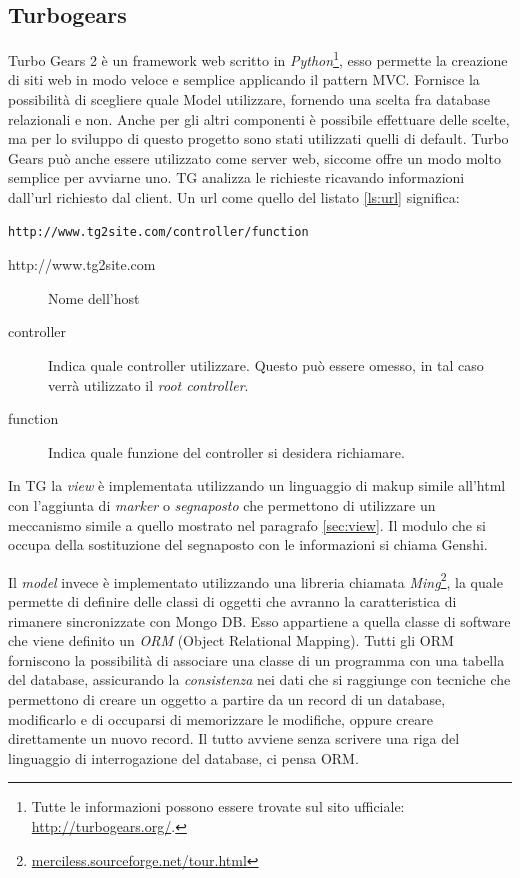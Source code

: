 \subsection{Turbogears}\label{sec:tg}
Turbo Gears 2 è un framework web scritto in \emph{Python}\footnote{Tutte le informazioni possono essere trovate sul sito ufficiale: \url{http://turbogears.org/}.}, esso permette la creazione di siti web in modo veloce e semplice applicando il pattern MVC. Fornisce la possibilità di scegliere quale Model utilizzare, fornendo una scelta fra database relazionali e non. Anche per gli altri componenti è possibile effettuare delle scelte, ma per lo sviluppo di questo progetto sono stati utilizzati quelli di default.
Turbo Gears può anche essere utilizzato come server web, siccome offre un modo molto semplice per avviarne uno.
TG analizza le richieste ricavando informazioni dall'url richiesto dal client. Un url come quello del listato \ref{ls:url} significa:
\begin{lstlisting}[label=ls:url,caption={Url per la richiesta di una pagina}]
http://www.tg2site.com/controller/function
\end{lstlisting}
		
\begin{description}
\item[http://www.tg2site.com] 
		
Nome dell'host
\item[controller]
		
Indica quale controller utilizzare. Questo pu\`o essere omesso, in tal caso verr\`a utilizzato il \emph{root controller}.
\item[function]
		
Indica quale funzione del controller si desidera richiamare.
\end{description}

In TG la \emph{view} è implementata utilizzando un linguaggio di makup simile all'html con l'aggiunta di \emph{marker} o \emph{segnaposto} che permettono di utilizzare un meccanismo simile a quello mostrato nel paragrafo \ref{sec:view}. Il modulo che si occupa della sostituzione del segnaposto con le informazioni si chiama Genshi.

Il \emph{model} invece è implementato utilizzando una libreria chiamata \emph{Ming}\footnote{\url{merciless.sourceforge.net/tour.html}}, la quale permette di definire delle classi di oggetti che avranno la caratteristica di rimanere sincronizzate con Mongo DB. Esso appartiene a quella classe di software che viene definito un \emph{ORM} (Object Relational Mapping). Tutti gli ORM forniscono la possibilità di associare una classe di un programma con una tabella del database, assicurando la \emph{consistenza} nei dati che si raggiunge con tecniche che permettono di creare un oggetto a partire da un record di un database, modificarlo e di occuparsi di memorizzare le modifiche, oppure creare direttamente un nuovo record. Il tutto avviene senza scrivere una riga del linguaggio di interrogazione del database, ci pensa ORM. 

